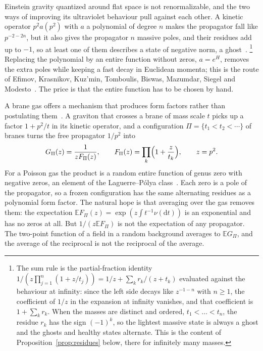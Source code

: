 \documentclass[aps,prd,twocolumn,superscriptaddress,nofootinbib,longbibliography,floatfix,amsmath,amssymb,10pt]{revtex4-2}
\theoremstyle{definition}
\theoremstyle{remark}
\newcommand{\E}{\mathbb{E}}
\newcommand{\dd}{\mathrm{d}}
\begin{document}
Einstein gravity quantized around flat space is not renormalizable, and the
two ways of improving its ultraviolet behaviour pull against each other. A
kinetic operator $p^2a(p^2)$ with $a$ a polynomial of degree $n$ makes the
propagator fall like $p^{-2-2n}$, but it also gives the propagator $n$ massive
poles, and their residues add up to $-1$, so at least one of them describes a
state of negative norm, a ghost~\cite{Stelle1977,AsoreyLopezShapiro1997}.%
\footnote{The sum rule is the partial-fraction identity
$1/(z\prod_{j=1}^n(1+z/t_j))=1/z+\sum_k r_k/(z+t_k)$ evaluated against the
behaviour at infinity: since the left side decays like $z^{-1-n}$ with
$n\ge1$, the coefficient of $1/z$ in the expansion at infinity vanishes, and
that coefficient is $1+\sum_kr_k$. When the masses are distinct and ordered,
$t_1<\dots<t_n$, the residue $r_k$ has the sign $(-1)^k$, so the lightest
massive state is always a ghost and the ghosts and healthy states alternate.
This is the content of Proposition~\ref{prop:residues} below, there for
infinitely many masses.} Replacing the polynomial by an entire function
without zeros, $a=e^{H}$, removes the extra poles while keeping a fast decay
in Euclidean momenta; this is the route of Efimov, Krasnikov, Kuz'min,
Tomboulis, Biswas, Mazumdar, Siegel and Modesto~\cite{Efimov1967,Krasnikov1987,Tomboulis1997,BiswasMazumdarSiegel2006,BGKM2012,Modesto2012,ModestoRachwal2014}.
The price is that the entire function has to be chosen by hand.

A brane gas offers a mechanism that produces form factors rather than
postulating them~\cite{SinghaRoy2025,Bhattacharjee2022,BCGarchive}. A
graviton that crosses a brane of mass scale $t$ picks up a factor $1+p^2/t$
in its kinetic operator, and a configuration $\Pi=\{t_1<t_2<\cdots\}$ of
branes turns the free propagator $1/p^2$ into
\begin{equation}\label{eq:G}
G_\Pi(z)=\frac{1}{zF_\Pi(z)},\qquad F_\Pi(z)=\prod_k\Bigl(1+\frac{z}{t_k}\Bigr),
\qquad z=p^2.
\end{equation}
For a Poisson gas the product is a random entire function of genus zero with
negative zeros, an element of the Laguerre--P\'olya class~\cite{Levin1964}.
Each zero is a pole of the propagator, so a frozen configuration has the same
alternating residues as a polynomial form factor. The natural hope is that
averaging over the gas removes them: the expectation $\E F_\Pi(z)=\exp(z\int
t^{-1}\nu(\dd t))$ is an exponential and has no zeros at all. But
$1/(z\E F_\Pi)$ is not the expectation of any propagator. The two-point
function of a field in a random background averages to $\E G_\Pi$, and the
average of the reciprocal is not the reciprocal of the average.
\end{document}
